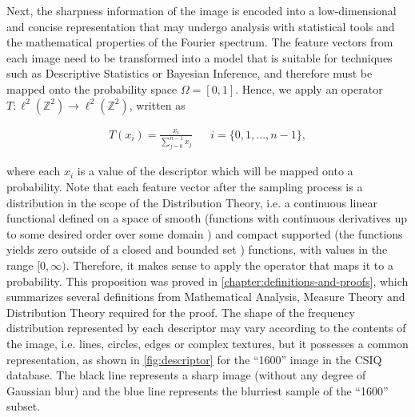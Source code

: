 Next, the sharpness information of the image is encoded into a low-dimensional and concise representation that may undergo analysis with statistical tools and the mathematical properties of the Fourier spectrum. The feature vectors from each image need to be transformed into a model that is suitable for techniques such as Descriptive Statistics or Bayesian Inference, and therefore must be mapped onto the probability space $\Omega = [0,1]$. Hence, we apply an operator $T : \ell^{2}(\mathbb{Z}^{2}) \rightarrow \ell^{2}(\mathbb{Z}^{2})$, written as

\begin{align}
\label{eqn:probability_operator}
T(x_{i}) = \frac{x_{i}}{\sum_{j=0}^{n-1}x_{j}}
&&  i = \{0,1,...,n-1\},
\end{align}

\noindent where each $x_{i}$ is a value of the descriptor which will be mapped onto a probability. Note that each feature vector after the sampling process is a distribution in the scope of the Distribution Theory, i.e. a continuous linear functional defined on a space of smooth (functions with continuous derivatives up to some desired order over some domain \cite{weisstein2020smooth}) and compact supported (the functions yields zero outside of a closed and bounded set \cite{weisstein2020compact}) functions, with values in the range $[0,\infty)$. Therefore, it makes sense to apply the operator that maps it to a probability. This proposition was proved in \autoref{chapter:definitions-and-proofs}, which summarizes several definitions from Mathematical Analysis, Measure Theory and Distribution Theory required for the proof. The shape of the frequency distribution represented by each descriptor may vary according to the contents of the image, i.e. lines, circles, edges or complex textures, but it possesses a common representation, as shown in \autoref{fig:descriptor} for the 
``1600'' image in the CSIQ database. The black line represents a sharp image (without any degree of Gaussian blur) and the blue line represents the blurriest sample of the ``1600'' subset.

